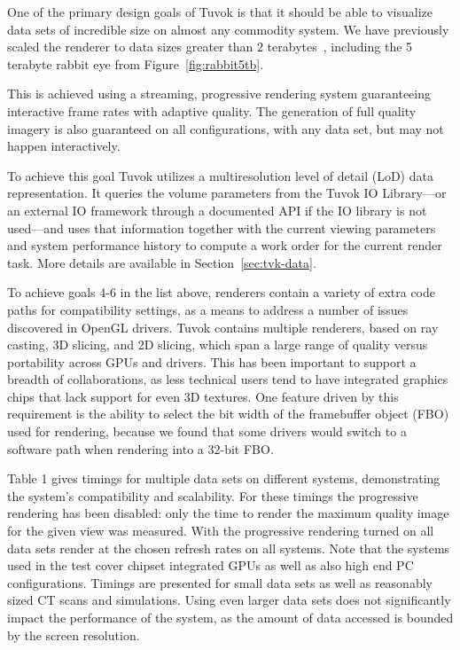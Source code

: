 One of the primary design goals of Tuvok is that it should be able
to visualize data sets of incredible size on almost any commodity
system. We have previously scaled the renderer to
data sizes greater than 2 terabytes~\cite{Fogal:2010:HPG}, including
the 5
terabyte rabbit eye from Figure~\ref{fig:rabbit5tb}.

This is achieved using a streaming, progressive rendering
system guaranteeing interactive frame rates with adaptive
quality. The generation of full quality imagery is also
guaranteed on all configurations, with any data set, but may not
happen interactively.

To achieve this goal Tuvok utilizes a multiresolution level of detail
(LoD) data representation. It queries the volume parameters from the
Tuvok IO Library---or an external IO framework through a documented
API if the IO library is not used---and uses that information together
with the current viewing parameters and system performance history to
compute a work order for the current render task. More
details are available in Section~\ref{sec:tvk-data}.

To achieve goals 4-6 in the list above, renderers contain a variety of
extra code paths for compatibility settings, as a means to address a
number of issues discovered in OpenGL drivers. Tuvok contains multiple
renderers, based on ray casting, 3D slicing, and 2D slicing, which span
a large range of quality versus portability across GPUs and drivers.
This has been important to support a breadth of collaborations, as
less technical users tend to have integrated graphics chips that
lack support for even 3D textures. One feature driven by this
requirement is the ability to select the bit width of the framebuffer
object (FBO) used for rendering, because we found that some drivers
would switch to a software path when rendering into a 32-bit FBO.

Table 1 gives timings for multiple data sets on different
systems, demonstrating the system's compatibility and scalability.
For these timings the progressive rendering has been
disabled: only the time to render the maximum quality
image for the given view was measured. With the progressive
rendering turned on all data sets render at the chosen refresh
rates on all systems. Note that the systems used in the test
cover chipset integrated GPUs as well as also high end PC
configurations. Timings are presented for small data sets as
well as reasonably sized CT scans and simulations. Using
even larger data sets does not significantly impact the
performance of the system, as the amount of data accessed is
bounded by the screen resolution.

